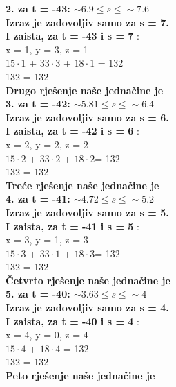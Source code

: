 \documentclass[12pt]{article}
\begin{document}
\begin{enumerate}
\begin{center}
         \vspace*{0.75cm}
          \textbf{2. za t = -43: $\sim6.9 \leq s \leq \sim7.6$\\Izraz je zadovoljiv samo za s = 7.\\I zaista, za t = -43 i s = 7} :\\ x = 1, y = 3, z = 1\\ $15\cdot1$ + $33\cdot3$ + $18\cdot1$ = 132\\ 132 = 132\\\textbf{Drugo rješenje naše jednačine je } \\
         \vspace*{0.75cm}
          \textbf{3. za t = -42: $\sim5.81 \leq s \leq \sim6.4$\\ \textbf{Izraz je zadovoljiv samo za s = 6.\\I zaista, za t = -42 i s = 6}} :\\ x = 2, y = 2, z = 2\\ $15\cdot2$ + $33\cdot2$ + $18\cdot2$= 132\\ 132 = 132\\\textbf{Treće rješenje naše jednačine je } \\
         \vspace*{0.75cm}
          \textbf{4. za t = -41: $\sim4.72 \leq s \leq \sim5.2$\\Izraz je zadovoljiv samo za s = 5.\\I zaista, za t = -41 i s = 5} :\\ x = 3, y = 1, z = 3\\ $15\cdot3$ + $33\cdot1$ + $18\cdot3$= 132\\ 132 = 132\\\textbf{Četvrto rješenje naše jednačine je } \\
         \vspace*{0.75cm}
           \textbf{5. za t = -40: $\sim3.63 \leq s \leq \sim4$\\Izraz je zadovoljiv samo za s = 4.\\I zaista, za t = -40 i s = 4} :\\ x = 4, y = 0, z = 4\\ $15\cdot4$ + $18\cdot4$ = 132\\ 132 = 132\\\textbf{Peto rješenje naše jednačine je } \\
         \vspace*{0.75cm}

\end{center}
\end{enumerate}
\end{document}
